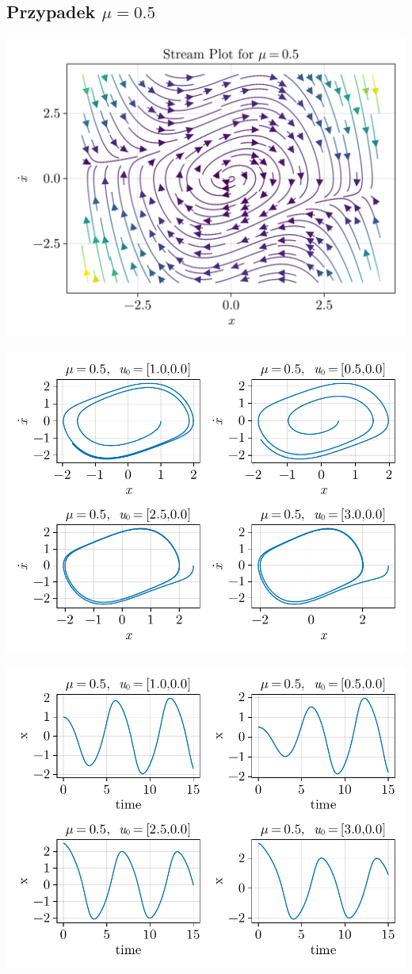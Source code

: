 \clearpage

%
%
\subsection{Przypadek $\mu = 0.5$}
\includegraphics[width=\textwidth]{out/stream_06.png}

\includegraphics[width=\textwidth]{out/phase_06.pdf}

\includegraphics[width=\textwidth]{out/xfromt_06.pdf}

